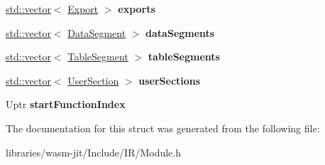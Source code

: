 \begin{DoxyCompactItemize}
\item 
\mbox{\label{struct_i_r_1_1_module_afcc776ae7fc46f6202700f3540b500d9}} 
\mbox{\hyperlink{classstd_1_1vector}{std\+::vector}}$<$ \mbox{\hyperlink{struct_i_r_1_1_export}{Export}} $>$ {\bfseries exports}
\item 
\mbox{\label{struct_i_r_1_1_module_af7d4ea2e86159b15bbe1a3c5ea57c69e}} 
\mbox{\hyperlink{classstd_1_1vector}{std\+::vector}}$<$ \mbox{\hyperlink{struct_i_r_1_1_data_segment}{Data\+Segment}} $>$ {\bfseries data\+Segments}
\item 
\mbox{\label{struct_i_r_1_1_module_a79205d5c2b09c7a2464f99e82f94be75}} 
\mbox{\hyperlink{classstd_1_1vector}{std\+::vector}}$<$ \mbox{\hyperlink{struct_i_r_1_1_table_segment}{Table\+Segment}} $>$ {\bfseries table\+Segments}
\item 
\mbox{\label{struct_i_r_1_1_module_a1e31553725937946ccd34c2a0a7411fa}} 
\mbox{\hyperlink{classstd_1_1vector}{std\+::vector}}$<$ \mbox{\hyperlink{struct_i_r_1_1_user_section}{User\+Section}} $>$ {\bfseries user\+Sections}
\item 
\mbox{\label{struct_i_r_1_1_module_a8d982a1899d9832570db181af07e6430}} 
Uptr {\bfseries start\+Function\+Index}
\end{DoxyCompactItemize}


The documentation for this struct was generated from the following file\+:\begin{DoxyCompactItemize}
\item 
libraries/wasm-\/jit/\+Include/\+I\+R/Module.\+h\end{DoxyCompactItemize}

